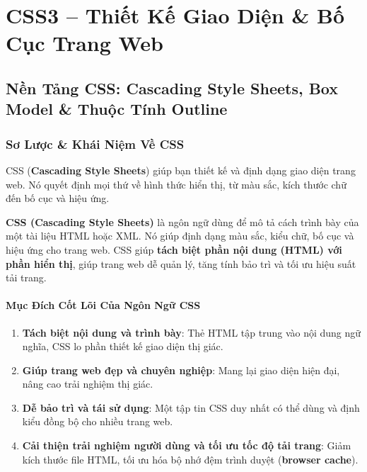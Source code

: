 \documentclass[11pt,oneside]{book}
\newcommand{\term}[1]{\textbf{\textcolor{primaryBlue}{#1}}}
\begin{document}
\tableofcontents
\clearpage

\mainmatter

\part{CSS3 -- Thiết Kế Giao Diện \& Bố Cục Trang Web}

\chapter{Nền Tảng CSS: Cascading Style Sheets, Box Model \& Thuộc Tính Outline}
\label{chap:css_foundations}

\section{Sơ Lược \& Khái Niệm Về CSS}

CSS (\term{Cascading Style Sheets}) giúp bạn thiết kế và định dạng giao diện trang web. Nó quyết định mọi thứ về hình thức hiển thị, từ màu sắc, kích thước chữ đến bố cục và hiệu ứng.

\begin{conceptBox}
\textbf{CSS (Cascading Style Sheets)} là ngôn ngữ dùng để mô tả cách trình bày của một tài liệu HTML hoặc XML. Nó giúp định dạng màu sắc, kiểu chữ, bố cục và hiệu ứng cho trang web. CSS giúp \textbf{tách biệt phần nội dung (HTML) với phần hiển thị}, giúp trang web dễ quản lý, tăng tính bảo trì và tối ưu hiệu suất tải trang.
\end{conceptBox}

\subsection{Mục Đích Cốt Lõi Của Ngôn Ngữ CSS}
\begin{enumerate}[leftmargin=1.5em, itemsep=4pt, parsep=0pt]
    \item \textbf{Tách biệt nội dung và trình bày}: Thẻ HTML tập trung vào nội dung ngữ nghĩa, CSS lo phần thiết kế giao diện thị giác.
    \item \textbf{Giúp trang web đẹp và chuyên nghiệp}: Mang lại giao diện hiện đại, nâng cao trải nghiệm thị giác.
    \item \textbf{Dễ bảo trì và tái sử dụng}: Một tập tin CSS duy nhất có thể dùng và định kiểu đồng bộ cho nhiều trang web.
    \item \textbf{Cải thiện trải nghiệm người dùng và tối ưu tốc độ tải trang}: Giảm kích thước file HTML, tối ưu hóa bộ nhớ đệm trình duyệt (\term{browser cache}).
\end{enumerate}
\end{document}
